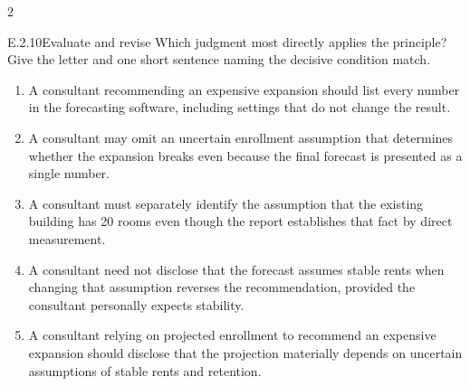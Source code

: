 \documentclass[9pt]{extarticle}
\newcommand{\choice}[1]{\item #1}
\begin{document}
\begin{multicols}{2}
\begin{DenseCoreProblem}{E.2.10}{Evaluate and revise}
Which judgment most directly applies the principle? Give the letter and one short sentence naming the decisive condition match.
\begin{enumerate}[label=(\alph*)]
  \choice{A consultant recommending an expensive expansion should list every number in the forecasting software, including settings that do not change the result.}
  \choice{A consultant may omit an uncertain enrollment assumption that determines whether the expansion breaks even because the final forecast is presented as a single number.}
  \choice{A consultant must separately identify the assumption that the existing building has 20 rooms even though the report establishes that fact by direct measurement.}
  \choice{A consultant need not disclose that the forecast assumes stable rents when changing that assumption reverses the recommendation, provided the consultant personally expects stability.}
  \choice{A consultant relying on projected enrollment to recommend an expensive expansion should disclose that the projection materially depends on uncertain assumptions of stable rents and retention.}
\end{enumerate}
\end{DenseCoreProblem}
\end{multicols}
\CoreWorkArea
\end{document}
